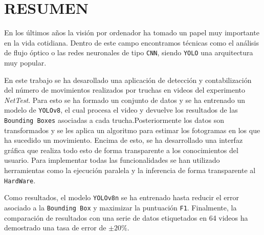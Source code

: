 \section*{RESUMEN}
\thispagestyle{abstract}
En los últimos años la visión por ordenador ha tomado un papel muy importante en la vida cotidiana. Dentro de este campo encontramos técnicas como el análisis de 
flujo óptico o las redes neuronales de tipo \texttt{CNN}, siendo \texttt{YOLO} una arquitectura muy popular.

En este trabajo se ha desarollado una aplicación de detección y contabilización del número de movimientos realizados por truchas en videos del experimento \textit{NetTest}. 
Para esto se ha formado un conjunto de datos y se ha entrenado un modelo de \texttt{YOLOv8}, el cual procesa el video y devuelve los resultados de las \texttt{Bounding Boxes} 
asociadas a cada trucha.\newline Posteriormente los datos son transformados y se les aplica un algoritmo para estimar los fotogramas en los que ha sucedido un movimiento. 
Encima de esto, se ha desarrollado una interfaz gráfica que realiza todo esto de forma transparente a los conocimientos del usuario. Para implementar todas las funcionalidades 
se han utilizado herramientas como la ejecución paralela y la inferencia de forma transparente al \texttt{HardWare}.

Como resultados, el modelo \texttt{YOLOv8n} se ha entrenado hasta reducir el error asociado a la \texttt{Bounding Box} y maximizar la puntuación \texttt{F1}. Finalmente, la 
comparación de resultados con una serie de datos etiquetados en 64 videos ha demostrado una tasa de error de \texttt{$ \pm 20\% $}.